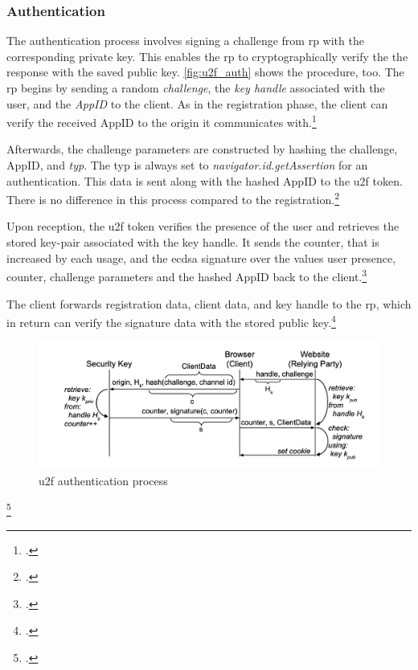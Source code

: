 \subsubsection{Authentication}

The authentication process involves signing a challenge from \gls{rp} with the corresponding private key. This enables the \gls{rp} to cryptographically verify the the response with the saved public key. \autoref{fig:u2f_auth} shows the procedure, too. The \gls{rp} begins by sending a random \textit{challenge}, the \textit{key handle} associated with the user, and the \textit{AppID} to the client. As in the registration phase, the client can verify the received AppID to the origin it communicates with.\footcites[See][3]{7860546}[See][6]{u2f-js-api}

Afterwards, the challenge parameters are constructed by hashing the challenge, AppID, and \textit{typ}. The typ is always set to \textit{navigator.id.getAssertion} for an authentication. This data is sent along with the hashed AppID to the \gls{u2f} token. There is no difference in this process compared to the registration.\footcites[See][6]{u2f-raw-message}

Upon reception, the \gls{u2f} token verifies the presence of the user and retrieves the stored key-pair associated with the key handle. It sends the counter, that is increased by each usage, and the \gls{ecdsa} signature over the values user presence, counter, challenge parameters and the hashed AppID back to the client.\footcites[431]{10.1007/978-3-662-54970-4_25}[See][7]{u2f-raw-message}

The client forwards registration data, client data, and key handle to the \gls{rp}, which in return can verify the signature data with the stored public key.\footcites[See][118]{IdentityandDataSecurityforWebDevelopment}

\begin{figure}[hbt]
	\centering
	\includegraphics[width=\textwidth]{pics/u2f_auth}
	\caption[\gls{u2f} authentication process]{\gls{u2f} authentication process\footnotemark}
	\label{fig:u2f_auth}
\end{figure}
\footcitetexts[Source: diagram by author, based on][70]{10.1007/978-3-319-75650-9_5}[][428]{10.1007/978-3-662-54970-4_25}

